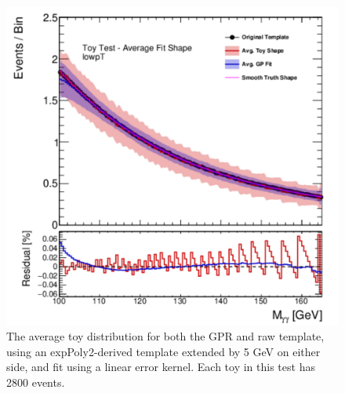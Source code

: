 \begin{figure} 
\begin{center}
  \includegraphics[width=\textwidth]{figures/background/gpr/validation/linear/ToyTest_AvgFitShape_lowpT_2800_noSig}   
\caption{The average toy distribution for both the GPR and raw template, using an expPoly2-derived template extended by 5 GeV on either side, and fit using a linear error kernel. Each toy in this test has 2800 events.}
\label{fig:linearkernel_lowpt_2800_noSig}
\end{center}
\end{figure}

